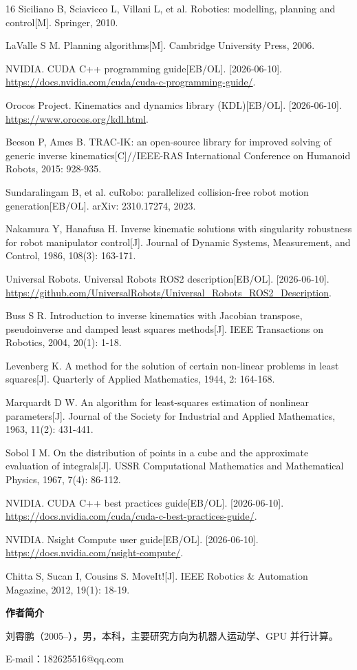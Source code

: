 \documentclass[twocolumn,a4paper,10pt]{ctexart}
\begin{document}
\FloatBarrier
\begin{thebibliography}{16}
Siciliano B, Sciavicco L, Villani L, et al. Robotics: modelling, planning and control[M]. Springer, 2010.

LaValle S M. Planning algorithms[M]. Cambridge University Press, 2006.

NVIDIA. CUDA C++ programming guide[EB/OL]. [2026-06-10]. \url{https://docs.nvidia.com/cuda/cuda-c-programming-guide/}.

Orocos Project. Kinematics and dynamics library (KDL)[EB/OL]. [2026-06-10]. \url{https://www.orocos.org/kdl.html}.

Beeson P, Ames B. TRAC-IK: an open-source library for improved solving of generic inverse kinematics[C]//IEEE-RAS International Conference on Humanoid Robots, 2015: 928-935.

Sundaralingam B, et al. cuRobo: parallelized collision-free robot motion generation[EB/OL]. arXiv: 2310.17274, 2023.

Nakamura Y, Hanafusa H. Inverse kinematic solutions with singularity robustness for robot manipulator control[J]. Journal of Dynamic Systems, Measurement, and Control, 1986, 108(3): 163-171.

Universal Robots. Universal Robots ROS2 description[EB/OL]. [2026-06-10]. \url{https://github.com/UniversalRobots/Universal_Robots_ROS2_Description}.

Buss S R. Introduction to inverse kinematics with Jacobian transpose, pseudoinverse and damped least squares methods[J]. IEEE Transactions on Robotics, 2004, 20(1): 1-18.

Levenberg K. A method for the solution of certain non-linear problems in least squares[J]. Quarterly of Applied Mathematics, 1944, 2: 164-168.

Marquardt D W. An algorithm for least-squares estimation of nonlinear parameters[J]. Journal of the Society for Industrial and Applied Mathematics, 1963, 11(2): 431-441.

Sobol I M. On the distribution of points in a cube and the approximate evaluation of integrals[J]. USSR Computational Mathematics and Mathematical Physics, 1967, 7(4): 86-112.

NVIDIA. CUDA C++ best practices guide[EB/OL]. [2026-06-10]. \url{https://docs.nvidia.com/cuda/cuda-c-best-practices-guide/}.

NVIDIA. Nsight Compute user guide[EB/OL]. [2026-06-10]. \url{https://docs.nvidia.com/nsight-compute/}.

Chitta S, Sucan I, Cousins S. MoveIt![J]. IEEE Robotics \& Automation Magazine, 2012, 19(1): 18-19.
\end{thebibliography}

\vspace{4mm}
{\bfseries 作者简介}

\vspace{2mm}
{\small 刘霄鹏（2005--），男，本科，主要研究方向为机器人运动学、GPU 并行计算。}\par
{\small E-mail：182625516@qq.com}\par
\end{document}
